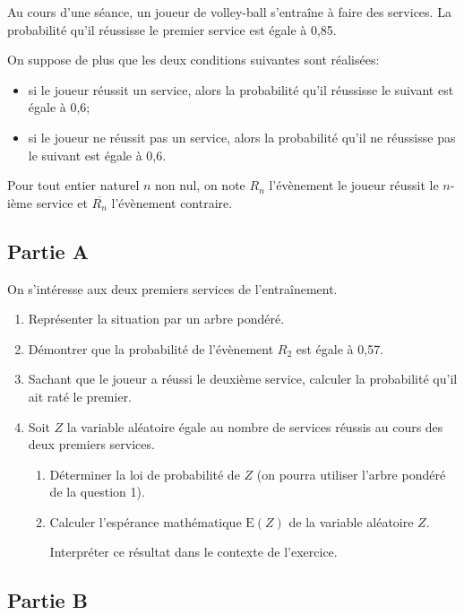 Au cours d'une séance, un joueur de volley-ball s'entraîne à faire des services. La probabilité qu'il réussisse le premier service est égale à 0,85.

On suppose de plus que les deux conditions suivantes sont réalisées:

\begin{itemize}[label=$\bullet$]
\item si le joueur réussit un service, alors la probabilité qu'il réussisse le suivant est égale à 0,6;
\item si le joueur ne réussit pas un service, alors la probabilité qu'il ne réussisse pas le suivant est égale à 0,6.
\end{itemize}

Pour tout entier naturel $n$ non nul, on note $R_{n}$ l'évènement \og le joueur réussit le $n$-ième service \fg{} et $\overline{R_{n}}$ l'évènement contraire.

\subsection*{Partie A}
On s'intéresse aux deux premiers services de l'entraînement.

\begin{enumerate}
	\item Représenter la situation par un arbre pondéré.
	\item Démontrer que la probabilité de l'évènement $R_{2}$ est égale à 0,57.
	\item Sachant que le joueur a réussi le deuxième service, calculer la probabilité qu'il ait raté le premier.
	\item Soit $Z$ la variable aléatoire égale au nombre de services réussis au cours des deux premiers services.
	\begin{enumerate}
		\item Déterminer la loi de probabilité de $Z$ (on pourra utiliser l'arbre pondéré de la question 1).
		\item Calculer l'espérance mathématique $\mathrm{E}(Z)$ de la variable aléatoire $Z$.

		Interpréter ce résultat dans le contexte de l'exercice.
	\end{enumerate}
\end{enumerate}

\subsection*{Partie B}

